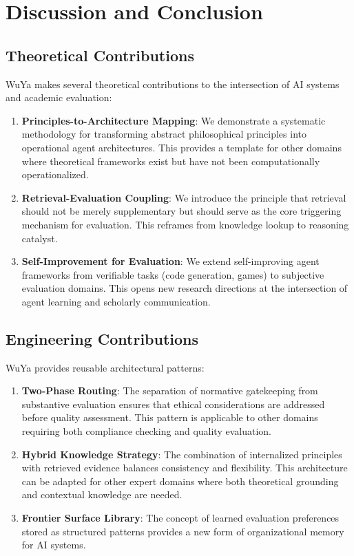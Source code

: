 \section{Discussion and Conclusion}
\label{sec:discussion}

\subsection{Theoretical Contributions}

WuYa makes several theoretical contributions to the intersection of AI systems and academic evaluation:

\begin{enumerate}
    \item \textbf{Principles-to-Architecture Mapping}: We demonstrate a systematic methodology for transforming abstract philosophical principles into operational agent architectures. This provides a template for other domains where theoretical frameworks exist but have not been computationally operationalized.

    \item \textbf{Retrieval-Evaluation Coupling}: We introduce the principle that retrieval should not be merely supplementary but should serve as the core triggering mechanism for evaluation. This reframes \rag{} from knowledge lookup to reasoning catalyst.

    \item \textbf{Self-Improvement for Evaluation}: We extend self-improving agent frameworks from verifiable tasks (code generation, games) to subjective evaluation domains. This opens new research directions at the intersection of agent learning and scholarly communication.
\end{enumerate}

\subsection{Engineering Contributions}

WuYa provides reusable architectural patterns:

\begin{enumerate}
    \item \textbf{Two-Phase Routing}: The separation of normative gatekeeping from substantive evaluation ensures that ethical considerations are addressed before quality assessment. This pattern is applicable to other domains requiring both compliance checking and quality evaluation.

    \item \textbf{Hybrid Knowledge Strategy}: The combination of internalized principles with retrieved evidence balances consistency and flexibility. This architecture can be adapted for other expert domains where both theoretical grounding and contextual knowledge are needed.

    \item \textbf{Frontier Surface Library}: The concept of learned evaluation preferences stored as structured patterns provides a new form of organizational memory for AI systems.
\end{enumerate}

